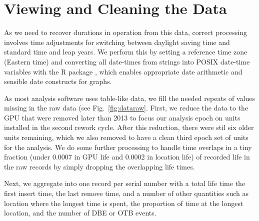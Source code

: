 \section{Viewing and Cleaning the Data}
\label{section:dataclean}
As we need to recover durations in operation from this data, correct
processing involves time adjustments for switching between daylight
saving time and standard time and leap years. We perform this by
setting a reference time zone (Eastern time) and converting all
date-times from strings into POSIX date-time variables with the R
 package \cite{lubridate}, which enables appropriate
date arithmetic and sensible date constructs for graphs.

As most analysis software uses table-like data, we fill the needed
repeats of values missing in the raw data (see
Fig.~\ref{fig:dataraw}. First, we reduce the data to the GPU that were
removed later than 2013 to focus our analysis epoch on units installed
in the second rework cycle. After this reduction, there were stil six
older units remaining, which we also removed to have a clean third
epoch set of units for the analysis. We do some further processing to
handle time overlaps in a tiny fraction (under 0.0007 in GPU life and
0.0002 in location life) of recorded life in the raw records by simply
dropping the overlapping life times.

Next, we aggregate into one record per serial number with a total life
time the first insert time, the last remove time, and a number of
other quantities such as location where the longest time is spent, the
proportion of time at the longest location, and the number of DBE or
OTB events.

